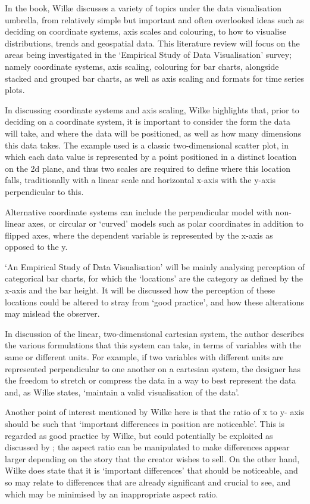 \documentclass[
  12pt,
]{book}
\begin{document}
In the book, Wilke discusses a variety of topics under the data
visualisation umbrella, from relatively simple but important and often
overlooked ideas such as deciding on coordinate systems, axis scales and
colouring, to how to visualise distributions, trends and geospatial
data. This literature review will focus on the areas being investigated
in the `Empirical Study of Data Visualisation' survey; namely coordinate
systems, axis scaling, colouring for bar charts, alongside stacked and
grouped bar charts, as well as axis scaling and formats for time series
plots.

In discussing coordinate systems and axis scaling, Wilke highlights
that, prior to deciding on a coordinate system, it is important to
consider the form the data will take, and where the data will be
positioned, as well as how many dimensions this data takes. The example
used is a classic two-dimensional scatter plot, in which each data value
is represented by a point positioned in a distinct location on the 2d
plane, and thus two scales are required to define where this location
falls, traditionally with a linear scale and horizontal x-axis with the
y-axis perpendicular to this.

Alternative coordinate systems can include the perpendicular model with
non-linear axes, or circular or `curved' models such as polar
coordinates in addition to flipped axes, where the dependent variable is
represented by the x-axis as opposed to the y.

`An Empirical Study of Data Visualisation' will be mainly analysing
perception of categorical bar charts, for which the `locations' are the
category as defined by the x-axis and the bar height. It will be
discussed how the perception of these locations could be altered to
stray from `good practice', and how these alterations may mislead the
observer.

In discussion of the linear, two-dimensional cartesian system, the
author describes the various formulations that this system can take, in
terms of variables with the same or different units. For example, if two
variables with different units are represented perpendicular to one
another on a cartesian system, the designer has the freedom to stretch
or compress the data in a way to best represent the data and, as Wilke
states, `maintain a valid visualisation of the data'.

Another point of interest mentioned by Wilke here is that the ratio of x
to y- axis should be such that `important differences in position are
noticeable'. This is regarded as good practice by Wilke, but could
potentially be exploited as discussed by \citet{Few2016}; the aspect
ratio can be manipulated to make differences appear larger depending on
the story that the creator wishes to sell. On the other hand, Wilke does
state that it is `important differences' that should be noticeable, and
so may relate to differences that are already significant and crucial to
see, and which may be minimised by an inappropriate aspect ratio.
\end{document}
